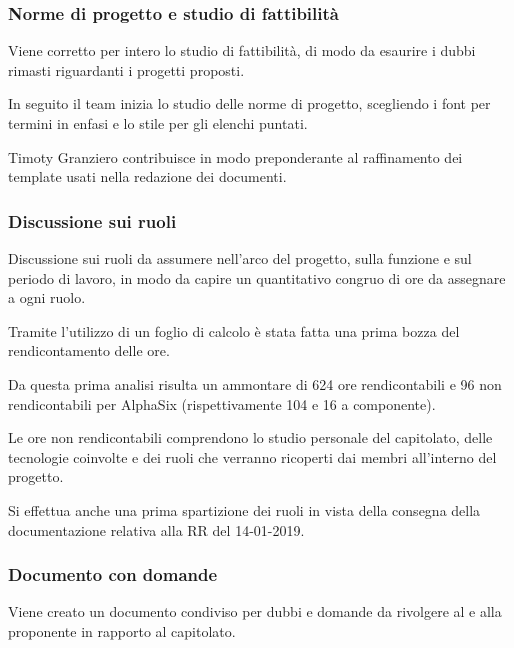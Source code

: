             \subsubsection{Norme di progetto e studio di fattibilità}
            Viene corretto per intero lo studio di fattibilità, di modo da esaurire i dubbi rimasti riguardanti i progetti proposti.\par
            In seguito il team inizia lo studio delle norme di progetto, scegliendo i font per termini in enfasi e lo stile per gli elenchi puntati.\par
            Timoty Granziero contribuisce in modo preponderante al raffinamento dei template usati nella redazione dei documenti.

            \subsubsection{Discussione sui ruoli}
            Discussione sui ruoli da assumere nell'arco del progetto, sulla funzione e sul periodo di lavoro, in modo da capire un quantitativo congruo di ore da assegnare a ogni ruolo.\par
            Tramite l'utilizzo di un foglio di calcolo è stata fatta una prima bozza del rendicontamento delle ore.\par
Da questa prima analisi risulta un ammontare di 624 ore rendicontabili e 96 non rendicontabili per AlphaSix (rispettivamente 104 e 16 a componente).\par
Le ore non rendicontabili comprendono lo studio personale del capitolato, delle tecnologie coinvolte e dei ruoli che verranno ricoperti dai membri all'interno del progetto.\par
Si effettua anche una prima spartizione dei ruoli in vista della consegna della documentazione relativa alla RR del 14-01-2019.\par

            \subsubsection{Documento con domande}
            Viene creato un documento condiviso per dubbi e domande da rivolgere al {\TV} e alla proponente {\II} in rapporto al capitolato.\par


